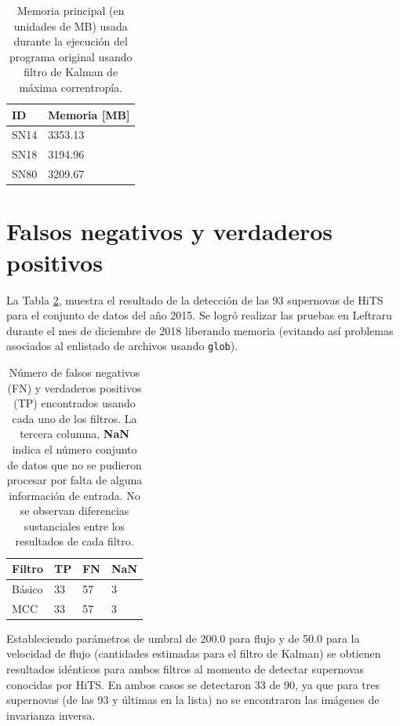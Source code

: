 \begin{table}[h!]
\centering
\caption{Memoria principal (en unidades de MB) usada durante la ejecuci\'on del programa original usando filtro de Kalman de m\'axima correntrop\'ia.}
\begin{tabular}{|l|l|}
\hline
\textbf{ID} & Memoria [MB]\\\hline\hline
SN14 & 3353.13\\\hline
SN18 & 3194.96\\\hline
SN80 & 3209.67\\\hline
\end{tabular}
\label{tab:mem2}
\end{table}

\section{Falsos negativos y verdaderos positivos}
La Tabla \ref{tab:tpfn}, muestra el resultado de la detecci\'on de las 93 supernovas de HiTS para el conjunto de datos del a\~no 2015. Se logr\'o realizar las pruebas en Leftraru durante el mes de diciembre de 2018 liberando memoria (evitando as\'i problemas asociados al enlistado de archivos usando \texttt{glob}).
\bigskip

\begin{table}[h!]
\centering
\caption{N\'umero de falsos negativos (FN) y verdaderos positivos (TP) encontrados usando cada uno de los filtros. La tercera columna, \textbf{NaN} indica el n\'umero conjunto de datos que no se pudieron procesar por falta de alguna informaci\'on de entrada. No se observan diferencias sustanciales entre los resultados de cada filtro.}
\begin{tabular}{|l|l|l|l|}
\hline
\textbf{Filtro} & \textbf{TP} & \textbf{FN} & \textbf{NaN}\\ \hline
Básico          & 33          & 57         & 3 \\ \hline
MCC             & 33          & 57         & 3 \\ \hline
\end{tabular}
\label{tab:tpfn}
\end{table}

Estableciendo par\'ametros de umbral de 200.0 para flujo y de 50.0 para la velocidad de flujo (cantidades estimadas para el filtro de Kalman) se obtienen resultados id\'enticos para ambos filtros al momento de detectar supernovas conocidas por HiTS. En ambos casos se detectaron 33 de 90, ya que para tres supernovas (de las 93 y \'ultimas en la lista) no se encontraron las im\'agenes de invarianza inversa.
\bigskip

